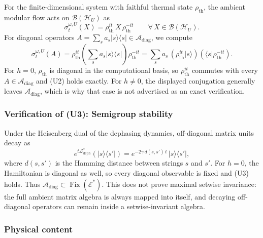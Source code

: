 \documentclass[12pt,a4paper,openany]{book}
\begin{document}
For the finite-dimensional system with faithful thermal state $\rho_{\mathrm{th}}$, the ambient modular flow acts on $\mathcal{B}(\mathcal{H}_U)$ as
\begin{equation}
\sigma_t^{\omega,U}(X) = \rho_{\mathrm{th}}^{it}\, X\, \rho_{\mathrm{th}}^{-it} \qquad \forall\, X \in \mathcal{B}(\mathcal{H}_U).
\end{equation}
For diagonal operators $A = \sum_s a_s |s\rangle\langle s| \in \mathcal{A}_{\mathrm{diag}}$, we compute
\begin{equation}
\sigma_t^{\omega,U}(A) = \rho_{\mathrm{th}}^{it} \left(\sum_s a_s |s\rangle\langle s|\right) \rho_{\mathrm{th}}^{-it} = \sum_s a_s\, (\rho_{\mathrm{th}}^{it}|s\rangle)(\langle s|\rho_{\mathrm{th}}^{-it}).
\end{equation}
For $h=0$, $\rho_{\mathrm{th}}$ is diagonal in the computational basis, so $\rho_{\mathrm{th}}^{it}$ commutes with every $A\in\mathcal A_{\mathrm{diag}}$ and (U2) holds exactly.  For $h\ne0$, the displayed conjugation generally leaves $\mathcal A_{\mathrm{diag}}$, which is why that case is not advertised as an exact verification.

\subsubsection{Verification of (U3): Semigroup stability}

Under the Heisenberg dual of the dephasing dynamics, off-diagonal matrix units decay as
\begin{equation}
e^{t\mathcal{L}_{\mathrm{deph}}^*}(|s\rangle\langle s'|) = e^{-2\gamma\, d(s,s')\, t}\, |s\rangle\langle s'|,
\end{equation}
where $d(s, s')$ is the Hamming distance between strings $s$ and $s'$.
For $h=0$, the Hamiltonian is diagonal as well, so every diagonal observable is fixed and (U3) holds.  Thus $\mathcal A_{\mathrm{diag}}\subset\operatorname{Fix}(\mathcal E^*)$.  This does not prove maximal setwise invariance: the full ambient matrix algebra is always mapped into itself, and decaying off-diagonal operators can remain inside a setwise-invariant algebra.

\subsubsection{Physical content}
\end{document}
